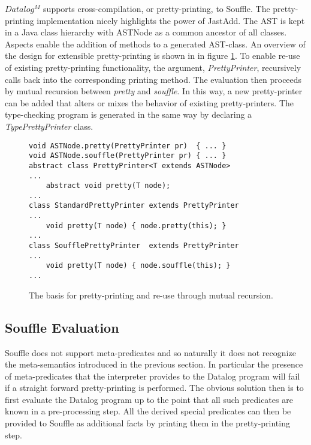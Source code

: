  $Datalog^M$ supports cross-compilation, or pretty-printing, to Souffle. The pretty-printing implementation nicely highlights the power of JastAdd. The AST is kept in a Java class hierarchy with ASTNode as a common ancestor of all classes.
Aspects enable the addition of methods to a generated AST-class. An overview of the design for extensible pretty-printing is shown in in figure \ref{figure:pretty}. To enable re-use of existing pretty-printing functionality, the argument, \textit{PrettyPrinter}, recursively calls back into the corresponding printing method. The evaluation then proceeds by mutual recursion between \textit{pretty} and \textit{souffle}. In this way, a new pretty-printer can be added that alters or mixes the behavior of existing pretty-printers. The type-checking program is generated in the same way by declaring a \textit{TypePrettyPrinter} class.


\begin{figure}
\begin{verbatim}
void ASTNode.pretty(PrettyPrinter pr)  { ... }
void ASTNode.souffle(PrettyPrinter pr) { ... }
abstract class PrettyPrinter<T extends ASTNode> 
...
    abstract void pretty(T node);
...
class StandardPrettyPrinter extends PrettyPrinter 
...
    void pretty(T node) { node.pretty(this); }
...
class SoufflePrettyPrinter  extends PrettyPrinter 
... 
    void pretty(T node) { node.souffle(this); }
...
\end{verbatim}
\caption{The basis for pretty-printing and re-use through mutual recursion.}
\label{figure:pretty}
\end{figure}
\noindent
\subsection{Souffle Evaluation}
Souffle does not support meta-predicates and so naturally it does not recognize the meta-semantics introduced in the previous section. In particular the presence of meta-predicates that the interpreter provides to the Datalog program will fail if a straight forward pretty-printing is performed. The obvious solution then is to first evaluate the Datalog program up to the point that all such predicates are known in a pre-processing step. All the derived special predicates can then be provided to Souffle as additional facts by printing them in the pretty-printing step.